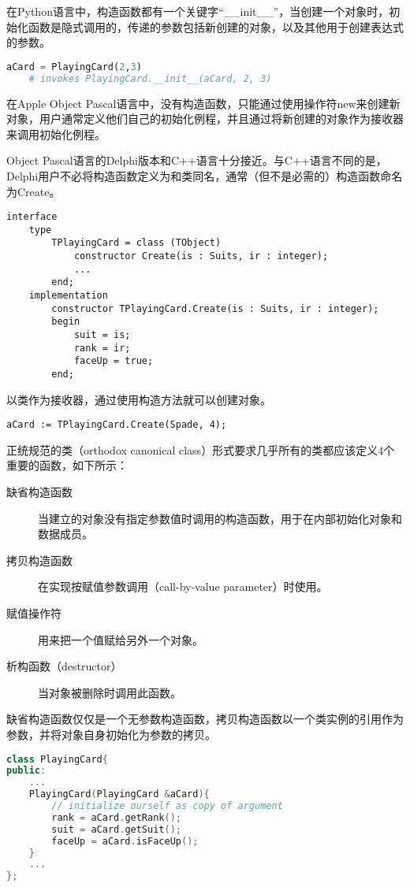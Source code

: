 在Python语言中，构造函数都有一个关键字“\_\_init\_\_”，当创建一个对象时，初始化函数是隐式调用的，传递的参数包括新创建的对象，以及其他用于创建表达式的参数。

\begin{lstlisting}[language=Python]
aCard = PlayingCard(2,3)
	# invokes PlayingCard.__init__(aCard, 2, 3)
\end{lstlisting}

在Apple Object Pascal语言中，没有构造函数，只能通过使用操作符new来创建新对象，用户通常定义他们自己的初始化例程，并且通过将新创建的对象作为接收器来调用初始化例程。

Object Pascal语言的Delphi版本和C++语言十分接近。与C++语言不同的是，Delphi用户不必将构造函数定义为和类同名，通常（但不是必需的）构造函数命名为Create。

\begin{lstlisting}[language=Delphi]
interface
	type
		TPlayingCard = class (TObject)
			constructor Create(is : Suits, ir : integer);
			...
		end;
	implementation
		constructor TPlayingCard.Create(is : Suits, ir : integer);
		begin
			suit = is;
			rank = ir;
			faceUp = true;
		end;
\end{lstlisting}

以类作为接收器，通过使用构造方法就可以创建对象。

\begin{lstlisting}[language=Delphi]
aCard := TPlayingCard.Create(Spade, 4);
\end{lstlisting}


正统规范的类（orthodox canonical class）形式要求几乎所有的类都应该定义4个重要的函数，如下所示：

\begin{description}
\item[缺省构造函数] 当建立的对象没有指定参数值时调用的构造函数，用于在内部初始化对象和数据成员。
\item[拷贝构造函数] 在实现按赋值参数调用（call-by-value parameter）时使用。
\item[赋值操作符] 用来把一个值赋给另外一个对象。
\item[析构函数（destructor）] 当对象被删除时调用此函数。
\end{description}

缺省构造函数仅仅是一个无参数构造函数，拷贝构造函数以一个类实例的引用作为参数，并将对象自身初始化为参数的拷贝。



\begin{lstlisting}[language=C++]
class PlayingCard{
public:
	...
	PlayingCard(PlayingCard &aCard){
		// initialize ourself as copy of argument
		rank = aCard.getRank();
		suit = aCard.getSuit();
		faceUp = aCard.isFaceUp();
	}
	...
};
\end{lstlisting}


